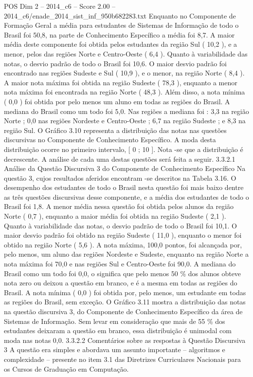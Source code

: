 \begin{textsample}{POS Dim 2 – 2014\_c6 – Score 2.00 – 2014\_c6/enade\_2014\_sist\_inf\_950b682283.txt}
Enquanto no Componente de Formação Geral a média para estudantes de Sistemas de Informação de todo o Brasil foi 50,8, na parte de Conhecimento Específico a média foi 8,7.
A maior média deste componente foi obtida pelos estudantes da região Sul ( 10,2 ), e a menor, pelos das regiões Norte e Centro-Oeste ( 6,4 ).
Quanto à variabilidade das notas, o desvio padrão de todo o Brasil foi 10,6.
O maior desvio padrão foi encontrado nas regiões Sudeste e Sul ( 10,9 ), e o menor, na região Norte ( 8,4 ).
A maior nota máxima foi obtida na região Sudeste ( 78,3 ), enquanto a menor nota máxima foi encontrada na região Norte ( 48,3 ).
Além disso, a nota mínima ( 0,0 ) foi obtida por pelo menos um aluno em todas as regiões do Brasil.
A mediana do Brasil como um todo foi 5,0.
Nas regiões a mediana foi : 3,3 na região Norte ; 0,0 nas regiões Nordeste e Centro-Oeste ; 6,7 na região Sudeste ; e 8,3 na região Sul.
O Gráfico 3.10 representa a distribuição das notas nas questões discursivas no Componente de Conhecimento Específico.
A moda desta distribuição ocorre no primeiro intervalo, [ 0 ; 10 ].
Nota -se que a distribuição é decrescente.
A análise de cada uma destas questões será feita a seguir. 3.3.2.1 Análise da Questão Discursiva 3 do Componente de Conhecimento Específico Na questão 3, cujos resultados aferidos encontram -se descritos na Tabela 3.16.
O desempenho dos estudantes de todo o Brasil nesta questão foi mais baixo dentre as três questões discursivas desse componente, e a média dos estudantes de todo o Brasil foi 1,8.
A menor média nessa questão foi obtida pelos alunos da região Norte ( 0,7 ), enquanto a maior média foi obtida na região Sudeste ( 2,1 ).
Quanto à variabilidade das notas, o desvio padrão de todo o Brasil foi 10,1.
O maior desvio padrão foi obtido na região Sudeste ( 11,0 ), enquanto o menor foi obtido na região Norte ( 5,6 ).
A nota máxima, 100,0 pontos, foi alcançada por, pelo menos, um aluno das regiões Nordeste e Sudeste, enquanto na região Norte a nota máxima foi 70,0 e nas regiões Sul e Centro-Oeste foi 90,0.
A mediana do Brasil como um todo foi 0,0, o significa que pelo menos 50 \% dos alunos obteve nota zero ou deixou a questão em branco, e é a mesma em todas as regiões do Brasil.
A nota mínima ( 0,0 ) foi obtida por, pelo menos, um estudante em todas as regiões do Brasil, sem exceção.
O Gráfico 3.11 mostra a distribuição das notas na questão discursiva 3, do Componente de Conhecimento Específico da área de Sistemas de Informação.
Sem levar em consideração que mais de 55 \% dos estudantes deixaram a questão em branco, essa distribuição é unimodal com moda nas notas 0,0. 3.3.2.2 Comentários sobre as respostas à Questão Discursiva 3 A questão era simples e abordava um assunto importante – algoritmos e complexidade – presente no item 3.1 das Diretrizes Curriculares Nacionais para os Cursos de Graduação em Computação.

\end{textsample}
